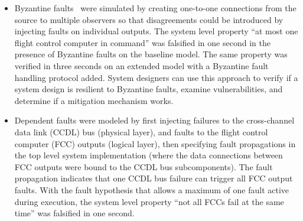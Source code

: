 \begin{itemize}
	\item Byzantine faults~\cite{Driscoll-Byzantine-Fault} were simulated by creating one-to-one connections from the source to multiple observers so that disagreements could be introduced by injecting faults on individual outputs. The system level property ``at most one flight control computer in command'' was falsified in one second in the presence of Byzantine faults on the baseline model. The same property was verified in three seconds on an extended model with a Byzantine fault handling protocol added.  System designers can use this approach to verify if a system design is resilient to Byzantine faults, examine vulnerabilities, and determine if a mitigation mechanism works.

	
	\item Dependent faults were modeled by first injecting failures to the cross-channel data link (CCDL) bus (physical layer), and faults to the flight control computer (FCC) outputs (logical layer), then specifying fault propagations in the top level system implementation (where the data connections between FCC outputs were bound to the CCDL bus subcomponents). The fault propagation indicates that one CCDL bus failure can trigger all FCC output faults. With the fault hypothesis that allows a maximum of one fault active during execution, the system level property ``not all FCCs fail at the same time'' was falsified in one second.
	
\end{itemize}

